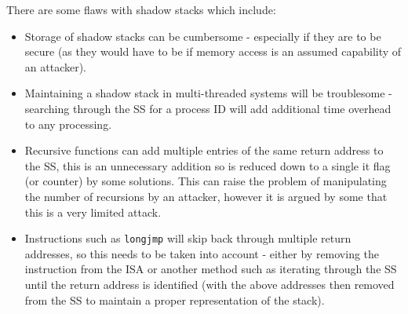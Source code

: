 There are some flaws with shadow stacks which include:
\begin{itemize}
	\item Storage of shadow stacks can be cumbersome - especially if they are to be secure (as they would have to be if memory access is an assumed capability of an attacker).
	\item Maintaining a shadow stack in multi-threaded systems will be troublesome - searching through the SS for a process ID will add additional time overhead to any processing.
	\item Recursive functions can add multiple entries of the same return address to the SS, this is an unnecessary addition so is reduced down to a single it flag (or counter) by some solutions. This can raise the problem of manipulating the number of recursions by an attacker, however it is argued by some that this is a very limited attack.
	\item Instructions such as \verb|longjmp| will skip back through multiple return addresses, so this needs to be taken into account - either by removing the instruction from the ISA or another method such as iterating through the SS until the return address is identified (with the above addresses then removed from the SS to maintain a proper representation of the stack).
\end{itemize}